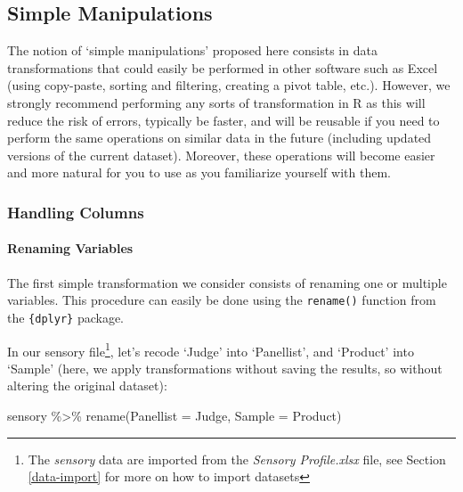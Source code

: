 \documentclass[
]{book}
\newenvironment{Shaded}{\begin{snugshade}}{\end{snugshade}}
\newcommand{\AttributeTok}[1]{\textcolor[rgb]{0.77,0.63,0.00}{#1}}
\newcommand{\FunctionTok}[1]{\textcolor[rgb]{0.00,0.00,0.00}{#1}}
\newcommand{\NormalTok}[1]{#1}
\newcommand{\SpecialCharTok}[1]{\textcolor[rgb]{0.00,0.00,0.00}{#1}}
\begin{document}
\hypertarget{simple-manipulations}{%
\subsection{Simple Manipulations}\label{simple-manipulations}}

The notion of `simple manipulations' proposed here consists in data transformations that could easily be performed in other software such as Excel (using copy-paste, sorting and filtering, creating a pivot table, etc.). However, we strongly recommend performing any sorts of transformation in R as this will reduce the risk of errors, typically be faster, and will be reusable if you need to perform the same operations on similar data in the future (including updated versions of the current dataset). Moreover, these operations will become easier and more natural for you to use as you familiarize yourself with them.

\hypertarget{handling-columns}{%
\subsubsection{Handling Columns}\label{handling-columns}}

\hypertarget{renaming-variables}{%
\paragraph{Renaming Variables}\label{renaming-variables}}

The first simple transformation we consider consists of renaming one or multiple variables. This procedure can easily be done using the \texttt{rename()} function from the \texttt{\{dplyr\}} package.

In our sensory file\footnote{The \emph{sensory} data are imported from the \emph{Sensory Profile.xlsx} file, see Section \ref{data-import} for more on how to import datasets}, let's recode `Judge' into `Panellist', and `Product' into `Sample' (here, we apply transformations without saving the results, so without altering the original dataset):

\begin{Shaded}
\begin{Highlighting}[]
\NormalTok{sensory }\SpecialCharTok{\%\textgreater{}\%} 
  \FunctionTok{rename}\NormalTok{(}\AttributeTok{Panellist =}\NormalTok{ Judge, }\AttributeTok{Sample =}\NormalTok{ Product)}
\end{Highlighting}
\end{Shaded}
\end{document}
